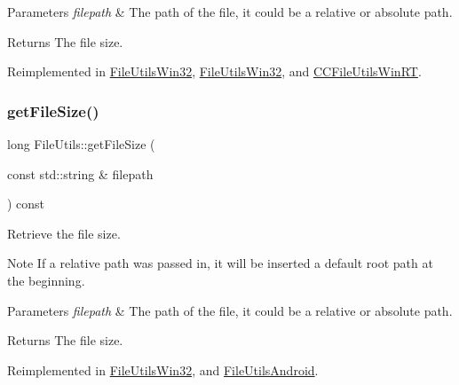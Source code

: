 \begin{DoxyParams}{Parameters}
{\em filepath} & The path of the file, it could be a relative or absolute path. \\
\hline
\end{DoxyParams}
\begin{DoxyReturn}{Returns}
The file size. 
\end{DoxyReturn}


Reimplemented in \hyperlink{classFileUtilsWin32_a55d29e8e6cf19e0863dd68a545583f63}{File\+Utils\+Win32}, \hyperlink{classFileUtilsWin32_af5e36ed946d6fc00cbb279755dbc6c5f}{File\+Utils\+Win32}, and \hyperlink{classCCFileUtilsWinRT_a56b2cacd3791ebf132e90b5abce17db3}{C\+C\+File\+Utils\+Win\+RT}.

\mbox{\label{classFileUtils_acba4a8730094e74096bfe4cede7f0315}} 
\subsubsection{\texorpdfstring{get\+File\+Size()}{getFileSize()}\hspace{0.1cm}{\footnotesize\ttfamily [2/3]}}
{\footnotesize\ttfamily long File\+Utils\+::get\+File\+Size (\begin{DoxyParamCaption}\item[{const std\+::string \&}]{filepath }\end{DoxyParamCaption}) const\hspace{0.3cm}{\ttfamily [virtual]}}

Retrieve the file size.

\begin{DoxyNote}{Note}
If a relative path was passed in, it will be inserted a default root path at the beginning. 
\end{DoxyNote}

\begin{DoxyParams}{Parameters}
{\em filepath} & The path of the file, it could be a relative or absolute path. \\
\hline
\end{DoxyParams}
\begin{DoxyReturn}{Returns}
The file size. 
\end{DoxyReturn}


Reimplemented in \hyperlink{classFileUtilsWin32_a49d0c49a6f1c8a9376d678596c17f502}{File\+Utils\+Win32}, and \hyperlink{classFileUtilsAndroid_a49e69c3f911538576eab8696083cdd39}{File\+Utils\+Android}.

